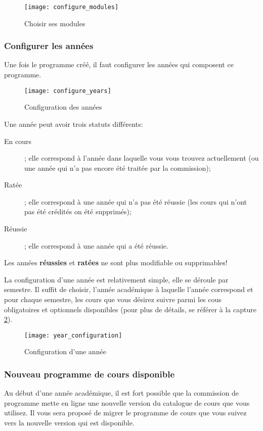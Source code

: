 \begin{figure}[htb]
\centering
\caption{Choisir ses modules}
\label{fig:configure_modules}
\texttt{[image: configure\_modules]}
\end{figure}

\subsubsection{Configurer les années}
Une fois le programme créé, il faut configurer les années qui composent ce programme.
\begin{figure}[htb]
\centering 
\caption{Configuration des années}
\label{fig:configure_years}
\texttt{[image: configure\_years]}
\end{figure}

Une année peut avoir trois statuts différents:
\begin{description}
\item[En cours] ; elle correspond à l'année dans laquelle vous vous trouvez actuellement (ou une année qui n'a pas encore été traitée par la commission);
\item[Ratée] ; elle correspond à une année qui n'a pas été réussie (les cours qui n'ont pas été crédités on été supprimés);
\item[Réussie] ; elle correspond à une année qui a été réussie.
\end{description}

Les années \textbf{réussies} et \textbf{ratées} ne sont plus modifiable ou supprimables!

La configuration d'une année est relativement simple, elle se déroule par semestre. Il suffit de choisir, l'année académique à laquelle l'année correspond et pour chaque semestre, les cours que vous désirez suivre parmi les cous obligatoires et optionnels disponibles (pour plus de détails, se référer à la capture \ref{fig:configure_years}).

\begin{figure}[htb]
\centering
\caption{Configuration d'une année}
\label{fig:configure_year}
\texttt{[image: year\_configuration]}
\end{figure}



\subsubsection{Nouveau programme de cours disponible}
Au début d'une année académique, il est fort possible que la commission de programme mette en ligne une nouvelle version du catalogue de cours que vous utilisez. Il vous sera proposé de migrer le programme de cours que vous suivez vers la nouvelle version qui est disponible. 

